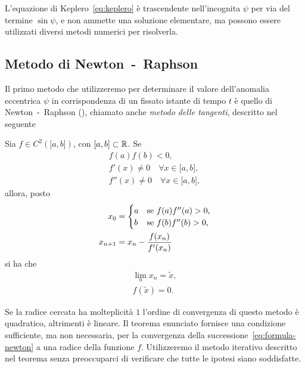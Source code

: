 L'equazione di Keplero~\eqref{eq:keplero} è trascendente nell'incognita $\psi$
per via del termine $\sin\psi$, e non ammette una soluzione elementare, ma
possono essere utilizzati diversi metodi numerici per risolverla.

\subsection{Metodo di Newton~-~Raphson}
\label{sec:newton}

Il primo metodo che utilizzeremo per determinare il valore dell'anomalia
eccentrica $\psi$ in corrispondenza di un fissato istante di tempo $t$ è quello
di Newton~-~Raphson (\textcite[30]{brugnano:calcolo-numerico}), chiamato anche
\emph{metodo delle tangenti}, descritto nel seguente
\begin{teorema}
  Sia $f\in C^2(\mathopen{[}a,b\mathclose{]})$, con
  $\mathopen{[}a,b\mathclose{]}\subset\mathbb{R}$. Se
  \begin{subequations}
    \begin{gather}
      f(a)f(b) <0, \label{eq:esistenza-zero}\\
      f'(x) \neq 0 \quad \forall x \in \mathopen{[}a,b\mathclose{]},\\
      f''(x) \neq 0 \quad \forall x \in \mathopen{[}a,b\mathclose{]},
    \end{gather}
  \end{subequations}
  allora, posto
  \begin{subequations}
    \begin{align}
      x_0 &=
      \begin{cases}
        a & \text{se $ f(a)f''(a)>0$,}\\
        b & \text{se $f(b)f''(b)>0$,}
      \end{cases}\\
      x_{n+1} &= x_n - \frac{f(x_n)}{f'(x_n)} \label{eq:formula-newton}
    \end{align}
  \end{subequations}
  si ha che
  \begin{subequations}
    \begin{gather}
      \lim_n x_n = \tilde{x},\\
      f(\tilde{x}) = 0.
    \end{gather}
  \end{subequations}
\end{teorema}
Se la radice cercata ha molteplicità $1$ l'ordine di convergenza di questo
metodo è quadratico, altrimenti è lineare. Il teorema enunciato fornisce una
condizione sufficiente, ma non necessaria, per la convergenza della
successione~\eqref{eq:formula-newton} a una radice della funzione
$f$. Utilizzeremo il metodo iterativo descritto nel teorema senza preoccuparci
di verificare che tutte le ipotesi siano soddisfatte.

